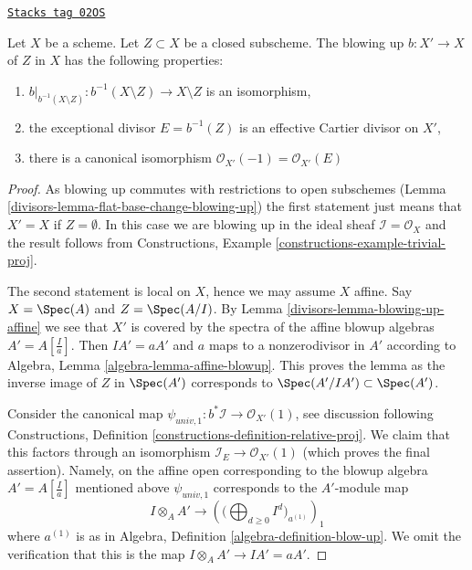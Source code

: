 \begin{lemma}
\label{divisors-lemma-blowing-up-gives-effective-Cartier-divisor}
\href{https://stacks.math.columbia.edu/tag/02OS}{\texttt{Stacks tag 02OS}}

Let $X$ be a scheme. Let $Z \subset X$ be a closed subscheme.
The blowing up $b : X' \to X$ of $Z$ in $X$
has the following properties:
\begin{enumerate}
\item $b|_{b^{-1}(X \setminus Z)} : b^{-1}(X \setminus Z) \to X \setminus Z$
is an isomorphism,
\item the exceptional divisor $E = b^{-1}(Z)$ is an effective Cartier divisor
on $X'$,
\item there is a canonical isomorphism
$\mathcal{O}_{X'}(-1) = \mathcal{O}_{X'}(E)$
\end{enumerate}
\end{lemma}

\begin{proof}

As blowing up commutes with restrictions to open subschemes
(Lemma \ref{divisors-lemma-flat-base-change-blowing-up}) the first statement
just means that $X' = X$ if $Z = \emptyset$. In this case we are blowing
up in the ideal sheaf $\mathcal{I} = \mathcal{O}_X$ and the result follows from
Constructions, Example \ref{constructions-example-trivial-proj}.

\medskip\noindent
The second statement is local on $X$, hence we may assume $X$ affine.
Say $X = \Spec(A)$ and $Z = \Spec(A/I)$. By Lemma \ref{divisors-lemma-blowing-up-affine}
we see that $X'$ is covered by the spectra of the affine blowup algebras
$A' = A[\frac{I}{a}]$. Then $IA' = aA'$ and $a$ maps to a nonzerodivisor
in $A'$ according to Algebra, Lemma \ref{algebra-lemma-affine-blowup}.
This proves the lemma as the inverse image of $Z$ in $\Spec(A')$
corresponds to $\Spec(A'/IA') \subset \Spec(A')$.

\medskip\noindent
Consider the canonical map
$\psi_{univ, 1} : b^*\mathcal{I} \to \mathcal{O}_{X'}(1)$, see
discussion following Constructions, Definition
\ref{constructions-definition-relative-proj}.
We claim that this factors through an isomorphism
$\mathcal{I}_E \to \mathcal{O}_{X'}(1)$ (which proves the final assertion).
Namely, on the affine open corresponding to the blowup algebra
$A' = A[\frac{I}{a}]$ mentioned above $\psi_{univ, 1}$ corresponds to
the $A'$-module map
$$
I \otimes_A A'
\longrightarrow
\left(\Big(\bigoplus\nolimits_{d \geq 0} I^d\Big)_{a^{(1)}}\right)_1
$$
where $a^{(1)}$ is as in Algebra, Definition \ref{algebra-definition-blow-up}.
We omit the verification that this is the map
$I \otimes_A A' \to IA' = aA'$.
\end{proof}

